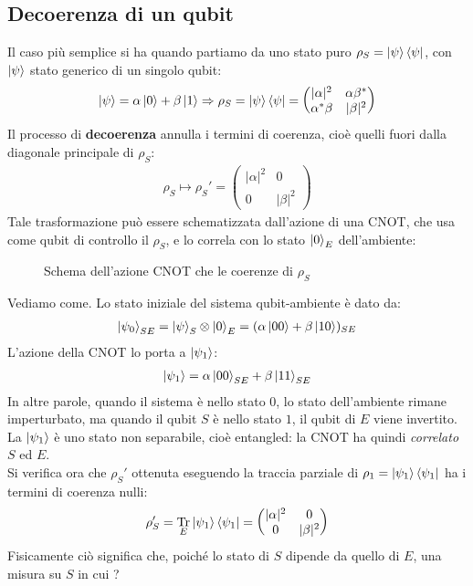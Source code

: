 \documentclass[../../InformazioneQuantistica.tex]{subfiles}
\begin{document}
\subsection{Decoerenza di un qubit}
Il caso più semplice si ha quando partiamo da uno stato puro $\rho_S = \Ket{\psi}\Bra{\psi}$, con $\Ket{\psi}$ stato generico di un singolo qubit:
\begin{align*}
\Ket{\psi}=\alpha\Ket{0} + \beta \Ket{1} \Rightarrow  \rho_S = \Ket{\psi}\Bra{\psi} = \begin{pmatrix} |\alpha|^2 & \alpha \beta^* \\ \alpha^* \beta & |\beta|^2 \end{pmatrix}
\end{align*}
Il processo di \textbf{decoerenza} annulla i termini di coerenza, cioè quelli fuori dalla diagonale principale di $\rho_S$:
\begin{align*}
\rho_S \mapsto \rho_S' =  \begin{pmatrix}|\alpha|^2 & 0 \\ 0 & |\beta|^2
\end{pmatrix}
\end{align*}
Tale trasformazione può essere schematizzata dall'azione di una CNOT, che usa come qubit di controllo il $\rho_S$, e lo correla con lo stato $\Ket{0}_E$ dell'ambiente:
\begin{figure}[H]
\centering

\caption{Schema dell'azione CNOT che  le coerenze di $\rho_S$\label{fig:qubit-CNOT}}
\end{figure}
Vediamo come. Lo stato iniziale del sistema qubit-ambiente è dato da:
\begin{align*}
\Ket{\psi_0}_{SE} = \Ket{\psi}_S\otimes \Ket{0}_E = (\alpha\Ket{00}+\beta\Ket{10})_{SE}
\end{align*}
L'azione della CNOT lo porta a $\Ket{\psi_1}$:
\begin{align*}
\Ket{\psi_1}=\alpha\Ket{00}_{SE}+\beta\Ket{11}_{SE}
\end{align*}
In altre parole, quando il sistema è nello stato $0$, lo stato dell'ambiente rimane imperturbato, ma quando il qubit $S$ è nello stato $1$, il qubit di $E$ viene invertito.\\
La $\Ket{\psi_1}$ è uno stato non separabile, cioè entangled: la CNOT ha quindi \textit{correlato} $S$ ed $E$.\\

Si verifica ora che $\rho_S'$ ottenuta eseguendo la traccia parziale di $\rho_1 = \Ket{\psi_1}\Bra{\psi_1}$ ha i termini di coerenza nulli:
\begin{align*}
\rho'_S = \underset{E}{\operatorname{Tr}} \Ket{\psi_1}\Bra{\psi_1} = \begin{pmatrix}|\alpha|^2 & 0\\ 0 & |\beta|^2\end{pmatrix}
\end{align*}
Fisicamente ciò significa che, poiché lo stato di $S$ dipende da quello di $E$, una misura su $S$ in cui ? %
\end{document}
